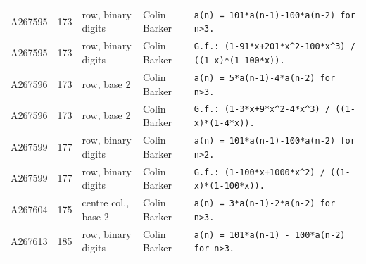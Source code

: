 \documentclass[11pt]{article}
\theoremstyle{definition}
\theoremstyle{remark}
\begin{document}
{\begin{longtable}{p{1.3cm}p{0.7cm}p{2.4cm}p{2.3cm}p{7.3cm}}
A267595 & 173 & row, binary digits & Colin Barker & \texttt{a(n)\allowbreak{} \allowbreak{}=\allowbreak{} \allowbreak{}101*\allowbreak{}a(n-\allowbreak{}1)\allowbreak{}-\allowbreak{}100*\allowbreak{}a(n-\allowbreak{}2)\allowbreak{} \allowbreak{}for \allowbreak{}n>3.} \\
A267595 & 173 & row, binary digits & Colin Barker & \texttt{G.f.: \allowbreak{}(1-\allowbreak{}91*\allowbreak{}x+\allowbreak{}201*\allowbreak{}x\^{}2-\allowbreak{}100*\allowbreak{}x\^{}3)\allowbreak{} \allowbreak{}/\allowbreak{} \allowbreak{}((1-\allowbreak{}x)\allowbreak{}*\allowbreak{}(1-\allowbreak{}100*\allowbreak{}x)\allowbreak{})\allowbreak{}.} \\
A267596 & 173 & row, base 2 & Colin Barker & \texttt{a(n)\allowbreak{} \allowbreak{}=\allowbreak{} \allowbreak{}5*\allowbreak{}a(n-\allowbreak{}1)\allowbreak{}-\allowbreak{}4*\allowbreak{}a(n-\allowbreak{}2)\allowbreak{} \allowbreak{}for \allowbreak{}n>3.} \\
A267596 & 173 & row, base 2 & Colin Barker & \texttt{G.f.: \allowbreak{}(1-\allowbreak{}3*\allowbreak{}x+\allowbreak{}9*\allowbreak{}x\^{}2-\allowbreak{}4*\allowbreak{}x\^{}3)\allowbreak{} \allowbreak{}/\allowbreak{} \allowbreak{}((1-\allowbreak{}x)\allowbreak{}*\allowbreak{}(1-\allowbreak{}4*\allowbreak{}x)\allowbreak{})\allowbreak{}.} \\
A267599 & 177 & row, binary digits & Colin Barker & \texttt{a(n)\allowbreak{} \allowbreak{}=\allowbreak{} \allowbreak{}101*\allowbreak{}a(n-\allowbreak{}1)\allowbreak{}-\allowbreak{}100*\allowbreak{}a(n-\allowbreak{}2)\allowbreak{} \allowbreak{}for \allowbreak{}n>2.} \\
A267599 & 177 & row, binary digits & Colin Barker & \texttt{G.f.: \allowbreak{}(1-\allowbreak{}100*\allowbreak{}x+\allowbreak{}1000*\allowbreak{}x\^{}2)\allowbreak{} \allowbreak{}/\allowbreak{} \allowbreak{}((1-\allowbreak{}x)\allowbreak{}*\allowbreak{}(1-\allowbreak{}100*\allowbreak{}x)\allowbreak{})\allowbreak{}.} \\
A267604 & 175 & centre col., base 2 & Colin Barker & \texttt{a(n)\allowbreak{} \allowbreak{}=\allowbreak{} \allowbreak{}3*\allowbreak{}a(n-\allowbreak{}1)\allowbreak{}-\allowbreak{}2*\allowbreak{}a(n-\allowbreak{}2)\allowbreak{} \allowbreak{}for \allowbreak{}n>3.} \\
A267613 & 185 & row, binary digits & Colin Barker & \texttt{a(n)\allowbreak{} \allowbreak{}=\allowbreak{} \allowbreak{}101*\allowbreak{}a(n-\allowbreak{}1)\allowbreak{} \allowbreak{}-\allowbreak{} \allowbreak{}100*\allowbreak{}a(n-\allowbreak{}2)\allowbreak{} \allowbreak{}for \allowbreak{}n>3.} \\

\end{longtable}}
\end{document}
